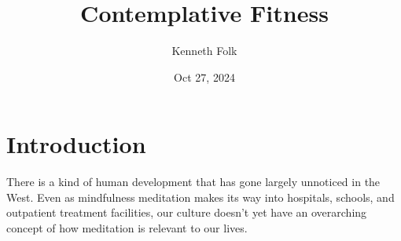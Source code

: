 \documentclass[a5paper,10pt,english]{book}
\title{Contemplative Fitness}
\date{Oct 27, 2024}
\author{Kenneth Folk}
\renewcommand{\releasename}{3f7e9ee}
\begin{document}
\pagestyle{empty}

\makeatletter%
%
\makeatother%

\pagestyle{plain}
\sphinxtableofcontents
\pagestyle{normal}
\label{\detokenize{index::doc}}


\frontmatter
\bgroup
\def\thesection{\arabic{section} }

\sphinxstepscope


\chapter{Introduction}
\label{\detokenize{front-intro:introduction}}\label{\detokenize{front-intro::doc}}
\setcounter{section}{0}

\sphinxAtStartPar
There is a kind of human development that has gone largely unnoticed in
the West. Even as mindfulness meditation makes its way into hospitals,
schools, and outpatient treatment facilities, our culture doesn’t yet
have an over\sphinxhyphen{}arching concept of how meditation is relevant to our lives.
\end{document}
